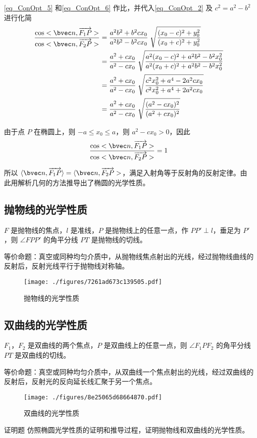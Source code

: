 \autoref{eq_ConOpt_5} 和\autoref{eq_ConOpt_6} 作比，并代入\autoref{eq_ConOpt_2} 及 $c^2=a^2-b^2$ 进行化简
\begin{equation}
\begin{aligned}
\frac{\cos<\bvec n,\overrightarrow{F_1P}>}{\cos<\bvec n,\overrightarrow{F_2P}>} &=\frac{a^2 b^2+b^2cx_0}{a^2 b^2-b^2cx_0}\; \sqrt{\frac{(x_0-c)^2+y_0^2}{(x_0+c)^2+y_0^2}} \\
&=\frac{a^2+cx_0}{a^2-cx_0}\; \sqrt{\frac{a^2(x_0-c)^2 +a^2 b^2-b^2 x_0^2}{a^2(x_0+c)^2 +a^2 b^2-b^2 x_0^2}} \\
&=\frac{a^2+cx_0}{a^2-cx_0}\; \sqrt{\frac{c^2 x_0^2 + a^4 - 2a^2 c x_0}{c^2 x_0^2 + a^4 + 2a^2 c x_0}} \\
&=\frac{a^2+cx_0}{a^2-cx_0}\; \sqrt{\frac{(a^2-cx_0)^2}{(a^2+cx_0)^2}}
\end{aligned}
\end{equation}

由于点 $P$ 在椭圆上，则 $-a\leqslant x_0 \leqslant a$，则 $a^2-cx_0 >0$，因此
\begin{equation}
\frac{\cos<\bvec n,\overrightarrow{F_1P}>}{\cos<\bvec n,\overrightarrow{F_2P}>}=1
\end{equation}

所以 $\langle \bvec n,\overrightarrow{F_1P}\rangle=\langle \bvec n,\overrightarrow{F_2P}>$，满足入射角等于反射角的反射定律。由此用解析几何的方法推导出了椭圆的光学性质。


\subsection{抛物线的光学性质}
$F$ 是抛物线的焦点，$l$ 是准线，$P$ 是抛物线上的任意一点，作 $PP' \perp l$，垂足为 $P'$，则 $\angle FPP' $ 的角平分线 $ PT $ 是抛物线的切线。

等价命题：真空或同种均匀介质中，从抛物线焦点射出的光线，经过抛物线曲线的反射后，反射光线平行于抛物线对称轴。
\begin{figure}[ht]
\centering
\texttt{[image: ./figures/7261ad673c139505.pdf]}
\caption{抛物线的光学性质} \label{fig_ConOpt_4}
\end{figure}

\subsection{双曲线的光学性质}
$F_1$，$F_2$ 是双曲线的两个焦点，$P$ 是双曲线上的任意一点，则 $\angle F_1PF_2 $ 的角平分线 $ PT $ 是双曲线的切线。

等价命题：真空或同种均匀介质中，从双曲线一个焦点射出的光线，经过双曲线的反射后，反射光的反向延长线汇聚于另一个焦点。
\begin{figure}[ht]
\centering
\texttt{[image: ./figures/8e25065d68664870.pdf]}
\caption{双曲线的光学性质} \label{fig_ConOpt_5}
\end{figure}

\begin{exercise}{证明题}\label{exe_ConOpt_1}
仿照椭圆光学性质的证明和推导过程，证明抛物线和双曲线的光学性质。
\end{exercise}
